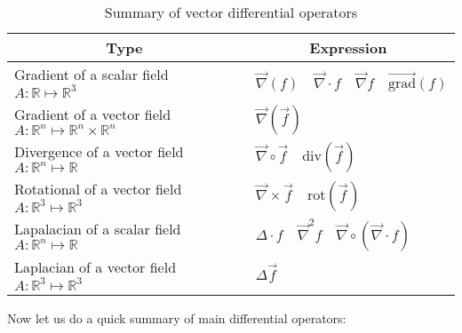 	\begin{table}[H]
		\begin{center}
				\begin{tabular}{|p{8cm}|p{6cm}|}
					\hline
					\multicolumn{1}{c}{\cellcolor{black!30}\textbf{Type}} & 
	  \multicolumn{1}{c}{\cellcolor{black!30}\textbf{Expression}} \\ \hline
					Gradient of a scalar field $A:\mathbb{R}\mapsto \mathbb{R}^3$ & \centering\arraybackslash\ $\vec{\nabla}(f) \quad \vec{\nabla}\cdot f \quad \vec{\nabla}f \quad \overrightarrow{\text{grad}}(f)$ \\ \hline
					Gradient of a vector field $A:\mathbb{R}^n\mapsto \mathbb{R}^n\times \mathbb{R}^n$ & \centering\arraybackslash\ $\vec{\nabla}(\vec{f})$  \\ \hline
					Divergence of a vector field $A:\mathbb{R}^n\mapsto \mathbb{R}$ & \centering\arraybackslash\ $\vec{\nabla}\circ \vec{f}\quad \text{div}(\vec{f})$  \\ \hline
					Rotational of a vector field $A:\mathbb{R}^3\mapsto \mathbb{R}^3$ & \centering\arraybackslash\ $\vec{\nabla}\times\vec{f}\quad \text{rot}(\vec{f})$  \\ \hline
					Lapalacian of a scalar field $A:\mathbb{R}^n\mapsto \mathbb{R}$ & 		\centering\arraybackslash\ $\Delta \cdot f\quad \vec{\nabla}^2 f\quad \vec{\nabla}\circ(\vec{\nabla}\cdot f)$  \\ \hline
					Laplacian of a vector field $A:\mathbb{R}^3\mapsto \mathbb{R}^3$& \centering\arraybackslash\  $\Delta\vec{f}$  \\ \hline
			\end{tabular}
		\end{center}
		\caption{Summary of vector differential operators}
	\end{table}
	Now let us do a quick summary of main differential operators:
